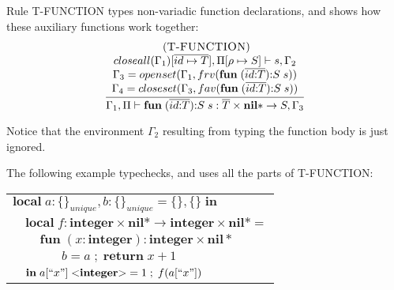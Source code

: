 \documentclass[preprint]{sigplanconf}
\newcommand{\Nil}{\mathbf{nil}}
\newcommand{\Integer}{\mathbf{integer}}
\newcommand{\String}{\mathbf{string}}
\newcommand{\Void}{\Nil{*}}
\newcommand{\mylabel}[1]{\; (\textsc{#1})}
\newcommand{\env}{\Gamma}
\newcommand{\penv}{\Pi}
\newcommand{\ret}{\rho}
\begin{document}
Rule {\sc T-FUNCTION} types non-variadic function declarations,
and shows how these auxiliary functions work together:
\[
\begin{array}{c}
\mylabel{T-FUNCTION}\\
\dfrac{\begin{array}{c}
	closeall(\env_{1})[\overline{id \mapsto T}], \penv[\ret \mapsto S] \vdash s, \env_{2}\\
	\env_{3} = openset(\env_{1}, frv(\mathbf{fun} \; (\overline{id{:}T}){:}S \; s)) \\
	\env_{4} = closeset(\env_{3}, fav(\mathbf{fun} \; (\overline{id{:}T}){:}S \; s))
	\end{array}}
{\env_{1}, \penv \vdash \mathbf{fun} \; (\overline{id{:}T}){:}S \; s:\overline{T} \times \Void \rightarrow S, \env_{3}}
\end{array}
\]

Notice that the environment $\env_{2}$ resulting from
typing the function body is just ignored.

The following example typechecks, and uses all the parts of {\sc T-FUNCTION}:
\begin{center}
\begin{tabular}{llll}
\multicolumn{4}{l}{$\mathbf{local} \; a:\{\}_{unique}, b:\{\}_{unique} = \{\}, \{\} \; \mathbf{in}$}\\
& \multicolumn{3}{l}{$\mathbf{local} \; f:\Integer \times \Void \rightarrow \Integer \times \Void =$}\\
& & \multicolumn{2}{l}{$\mathbf{fun} \; (x:\Integer):\Integer \times \Void$}\\
& & & \multicolumn{1}{l}{$b = a \;;\; \mathbf{return} \; x + 1$}\\
& \multicolumn{3}{l}{$\mathbf{in} \; a[``x"] \; {<}\Integer{>} = 1 \;;\; f(a[``x"])$}\\
\end{tabular}
\end{center}
\end{document}
